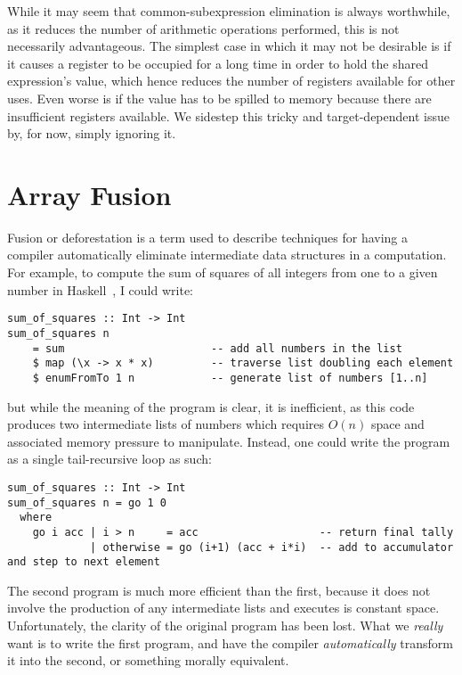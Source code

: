 While it may seem that common-subexpression elimination is always worthwhile, as
it reduces the number of arithmetic operations performed, this is not
necessarily advantageous. The simplest case in which it may not be desirable is
if it causes a register to be occupied for a long time in order to hold the
shared expression's value, which hence reduces the number of registers available
for other uses. Even worse is if the value has to be spilled to memory because
there are insufficient registers available. We sidestep this tricky and
target-dependent issue by, for now, simply ignoring it.




\section{Array Fusion}

Fusion or deforestation is a term used to describe techniques for having a
compiler automatically eliminate intermediate data structures in a computation.
For example, to compute the sum of squares of all integers from one to a given
number in Haskell~\cite{Haskell:1998}, I could write:
%
\begin{lstlisting}[style=haskell]
sum_of_squares :: Int -> Int
sum_of_squares n
    = sum                       -- add all numbers in the list
    $ map (\x -> x * x)         -- traverse list doubling each element
    $ enumFromTo 1 n            -- generate list of numbers [1..n]
\end{lstlisting}
%
but while the meaning of the program is clear, it is inefficient, as this code
produces two intermediate lists of numbers which requires $O(n)$ space and
associated memory pressure to manipulate. Instead, one could write the program
as a single tail-recursive loop as such:
%
\begin{lstlisting}[style=haskell]
sum_of_squares :: Int -> Int
sum_of_squares n = go 1 0
  where
    go i acc | i > n     = acc                   -- return final tally
             | otherwise = go (i+1) (acc + i*i)  -- add to accumulator and step to next element
\end{lstlisting}
%
The second program is much more efficient than the first, because it does not
involve the production of any intermediate lists and executes is constant space.
Unfortunately, the clarity of the original program has been lost. What we
\emph{really} want is to write the first program, and have the compiler
\emph{automatically} transform it into the second, or something morally
equivalent.


